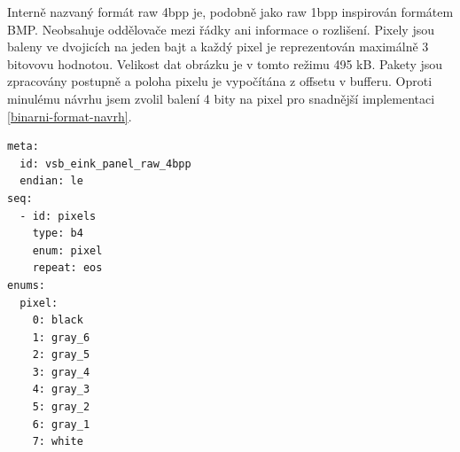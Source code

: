 Interně nazvaný formát raw 4bpp je, podobně jako raw 1bpp inspirován formátem BMP. Neobsahuje oddělovače mezi řádky ani informace o rozlišení. Pixely jsou baleny ve dvojicích na jeden bajt a každý pixel je reprezentován maximálně 3 bitovovu hodnotou. Velikost dat obrázku je v tomto režimu 495 kB. Pakety jsou zpracovány postupně a poloha pixelu je vypočítána z offsetu v bufferu. Oproti minulému návrhu jsem zvolil balení 4 bity na pixel pro snadnější implementaci \ref{binarni-format-navrh}.

\begin{lstlisting}[label=src:kaitai-4bpp,caption={Kaitai schéma formátu raw 4bpp}]
meta:
  id: vsb_eink_panel_raw_4bpp
  endian: le
seq:
  - id: pixels
    type: b4
    enum: pixel
    repeat: eos
enums:
  pixel:
    0: black
    1: gray_6
    2: gray_5
    3: gray_4
    4: gray_3
    5: gray_2
    6: gray_1
    7: white
\end{lstlisting}

